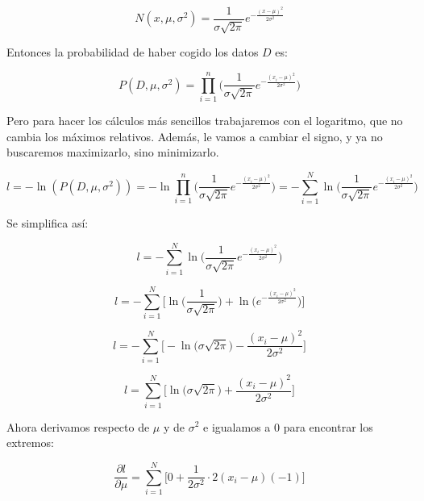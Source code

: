 \documentclass[a4paper,10pt]{article}
\begin{document}
\begin{equation*}
  N(x, \mu, \sigma^2) = \frac{1}{\sigma\sqrt{2\pi}}e^{-\frac{(x - \mu)^2}{2\sigma^2}}
\end{equation*}

Entonces la probabilidad de haber cogido los datos $D$ es:

\begin{equation*}
  P(D, \mu, \sigma^2) = \prod_{i = 1}^{n} \Big( \frac{1}{\sigma\sqrt{2\pi}}e^{-\frac{(x_i - \mu)^2}{2\sigma^2}} \Big)
\end{equation*}

Pero para hacer los cálculos más sencillos trabajaremos con el logaritmo, que no cambia los máximos relativos. Además, le vamos a cambiar el signo, y ya no buscaremos maximizarlo, sino minimizarlo.

\begin{equation*}
  l = -\ln(P(D, \mu, \sigma^2)) = -\ln \prod_{i = 1}^{n} \Big( \frac{1}{\sigma\sqrt{2\pi}}e^{-\frac{(x_i - \mu)^2}{2\sigma^2}} \Big) = -\sum_{i = 1}^{N} \ln \big( \frac{1}{\sigma\sqrt{2\pi}}e^{-\frac{(x_i - \mu)^2}{2\sigma^2}} \big)
\end{equation*}

Se simplifica así:

\begin{equation*}
  l = -\sum_{i = 1}^{N} \ln \big( \frac{1}{\sigma\sqrt{2\pi}}e^{-\frac{(x_i - \mu)^2}{2\sigma^2}} \big)
\end{equation*}

\begin{equation*}
  l = -\sum_{i = 1}^{N} \Big[ \ln \big( \frac{1}{\sigma\sqrt{2\pi}} \big) + \ln \big( e^{-\frac{(x_i - \mu)^2}{2\sigma^2}} \big) \Big]
\end{equation*}

\begin{equation*}
  l = -\sum_{i = 1}^{N} \Big[ -\ln \big( \sigma\sqrt{2\pi} \big) - \frac{(x_i - \mu)^2}{2\sigma^2} \Big]
\end{equation*}

\begin{equation*}
  l = \sum_{i = 1}^{N} \Big[ \ln \big( \sigma\sqrt{2\pi} \big) + \frac{(x_i - \mu)^2}{2\sigma^2} \Big]
\end{equation*}

Ahora derivamos respecto de $\mu$ y de $\sigma^2$ e igualamos a 0 para encontrar los extremos:

\begin{equation*}
\frac{\partial l}{\partial \mu} = \sum_{i = 1}^{N} \Big[ 0 + \frac{1}{2\sigma^2} \cdot 2(x_i - \mu)(-1) \Big]
\end{equation*}
\end{document}
